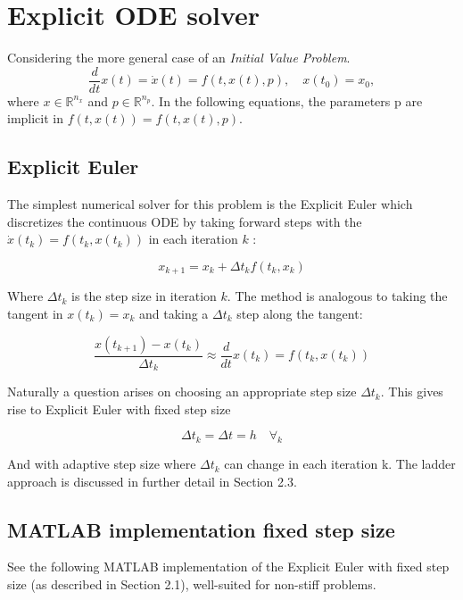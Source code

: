 \section{Explicit ODE solver}
Considering the more general case of an \textit{Initial Value Problem}.
$$
\frac{d}{d t} x(t)= \dot{x}(t)=f(t, x(t), p), \quad x\left(t_{0}\right)=x_{0},
$$
where $x \in \mathbb{R}^{n_{x}}$ and $p \in \mathbb{R}^{n_{p}}$. In the following equations, the parameters p are implicit in $f(t, x(t)) = f(t, x(t), p)$.

\subsection{Explicit Euler}
The simplest numerical solver for this problem is the Explicit Euler which discretizes the continuous ODE by taking forward steps with the $\dot{x}(t_k) = f(t_k, x(t_k))$ in each iteration $k$ \cite{JrgensenScientificEquations}:

\begin{equation}
    x_{k+1}=x_{k}+\Delta t_k f\left(t_{k}, x_{k}\right)
\end{equation}

Where $\Delta t_k$ is the step size in iteration $k$. The method is analogous to taking the tangent in $x(t_k) = x_k$ and taking a $\Delta t_k$ step along the tangent:

\begin{equation}
\frac{x\left(t_{k+1}\right)-x\left(t_{k}\right)}{\Delta t_{k}} \approx \frac{d}{d t} x\left(t_{k}\right)=f\left(t_{k}, x\left(t_{k}\right)\right)
\end{equation}

Naturally a question arises on choosing an appropriate step size $\Delta t_k$. This gives rise to Explicit Euler with fixed step size

\begin{equation*}
    \Delta t_k = \Delta t = h \quad \forall_k
\end{equation*}

And with adaptive step size where $\Delta t_k$ can change in each iteration k. The ladder approach is discussed in further detail in Section 2.3.

\subsection{MATLAB implementation fixed step size}
See the following MATLAB implementation of the Explicit Euler with fixed step size (as described in Section 2.1), well-suited for non-stiff problems.

